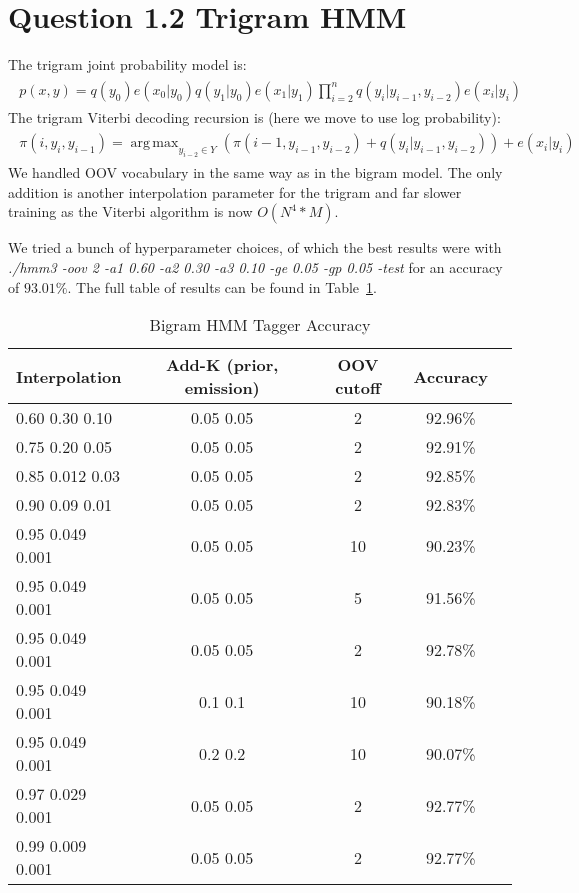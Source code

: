 \documentclass[11pt]{article}
\DeclareMathOperator*{\argmax}{arg\,max}
\begin{document}
\section*{Question 1.2 Trigram HMM}

The trigram joint probability model is:
\begin{align}
	\begin{split}
		p(x,y) = q(y_0)e(x_0|y_0)q(y_1|y_0)e(x_1|y_1)\prod_{i=2}^{n}q(y_i|y_{i-1},y_{i-2})e(x_i|y_i)
	\end{split}
\end{align}
The trigram Viterbi decoding recursion is (here we move to use log probability):
\begin{align}
	\begin{split}
		\pi(i, y_i, y_{i-1}) = \argmax_{y_{i-2} \in Y} (\pi(i-1, y_{i-1}, y_{i-2}) + q(y_i|y_{i-1},y_{i-2})) + e(x_i|y_i)
	\end{split}
\end{align}
We handled OOV vocabulary in the same way as in the bigram model. The only addition is another interpolation parameter for the trigram and far slower training as the Viterbi algorithm is now $O(N^4*M)$. 

We tried a bunch of hyperparameter choices, of which the best results were with \textit{./hmm3 -oov 2 -a1 0.60 -a2 0.30 -a3 0.10 -ge 0.05 -gp 0.05 -test} for an accuracy of $93.01\%$. The full table of results can be found in Table~\ref{tbl:hmm3}.

\begin{table}
	\begin{center}
		\begin{tabular}{l|c|c|c|c|}
		\textbf{Interpolation} & \textbf{Add-K (prior, emission)} & \textbf{OOV cutoff} & \textbf{Accuracy} \\
		\hline
		0.60 0.30 0.10 & 0.05 0.05 & 2 & 92.96\% \\
		0.75 0.20 0.05 & 0.05 0.05 & 2 & 92.91\% \\
		0.85 0.012 0.03 & 0.05 0.05 & 2 & 92.85\% \\
		0.90 0.09 0.01 & 0.05 0.05 & 2 & 92.83\% \\
		0.95 0.049 0.001 & 0.05 0.05 & 10 & 90.23\% \\
		0.95 0.049 0.001 & 0.05 0.05 & 5 & 91.56\% \\
		0.95 0.049 0.001 & 0.05 0.05 & 2 & 92.78\% \\
		0.95 0.049 0.001 & 0.1 0.1 & 10 & 90.18\% \\
		0.95 0.049 0.001 & 0.2 0.2 & 10 & 90.07\% \\
		0.97 0.029 0.001 & 0.05 0.05 & 2 & 92.77\% \\
		0.99 0.009 0.001 & 0.05 0.05 & 2 &  92.77\%
		\end{tabular}\
		\caption{Bigram HMM Tagger Accuracy}
		\label{tbl:hmm3}
	\end{center}
\end{table}
\end{document}
